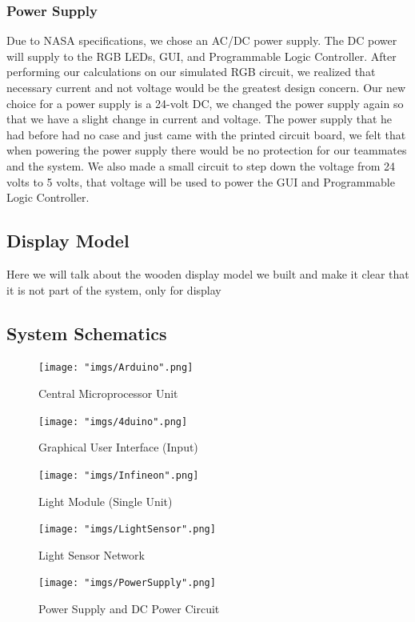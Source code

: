\documentclass[12pt,a4paper]{report}
\begin{document}
\subsubsection{Power Supply}
Due to NASA specifications, we chose an AC/DC power supply. The DC power will supply to the RGB LEDs, GUI, and Programmable Logic Controller. After performing our calculations on our simulated RGB circuit, we realized that necessary current and not voltage would be the greatest design concern. Our new choice for a power supply is a 24-volt DC, we changed the power supply again so that we have a slight change in current and voltage. The power supply that he had before had no case and just came with the printed circuit board, we felt that when powering the power supply there would be no protection for our teammates and the system. We also made a small circuit to step down the voltage from 24 volts to 5 volts, that voltage will be used to power the GUI and Programmable Logic Controller. 

\subsection{Display Model}
Here we will talk about the wooden display model we built and make it clear that it is not part of the system, only for display
\newpage
\subsection{System Schematics}
\begin{figure}[H]
	\centering
	\texttt{[image: "imgs/Arduino".png]}\par			\vspace{0.1cm}
	\caption{Central Microprocessor Unit}
\end{figure}
\newpage
\begin{figure}[H]
	\centering
	\texttt{[image: "imgs/4duino".png]}\par			\vspace{0.1cm}
	\caption{Graphical User Interface (Input)}
\end{figure}
\newpage
\begin{figure}[H]
	\centering
	\texttt{[image: "imgs/Infineon".png]}\par			\vspace{0.1cm}
	\caption{Light Module (Single Unit)}
\end{figure}
\newpage
\begin{figure}[H]
	\centering
	\texttt{[image: "imgs/LightSensor".png]}\par			\vspace{0.1cm}
	\caption{Light Sensor Network}
\end{figure}
\newpage
\begin{figure}[H]
	\centering
	\texttt{[image: "imgs/PowerSupply".png]}\par			\vspace{0.1cm}
	\caption{Power Supply and DC Power Circuit}
\end{figure}
\newpage
\end{document}
